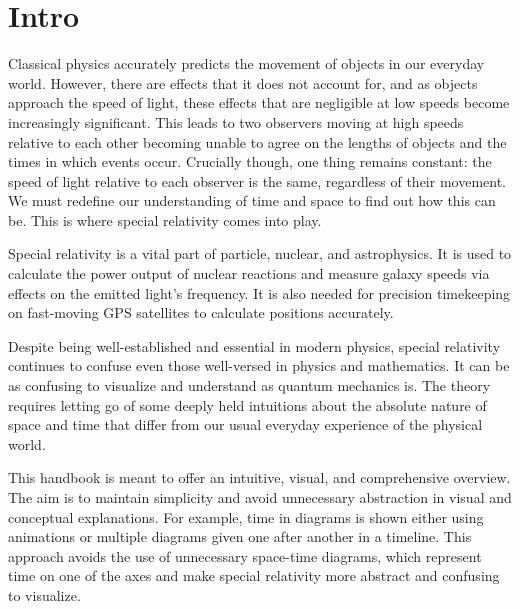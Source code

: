 \frontmatter
\chapter{Intro}

Classical physics accurately predicts the movement of objects in our everyday world. However, there are effects that it does not account for, and as objects approach the speed of light, these effects that are negligible at low speeds become increasingly significant. This leads to two observers moving at high speeds relative to each other becoming unable to agree on the lengths of objects and the times in which events occur. Crucially though, one thing remains constant: the speed of light relative to each observer is the same, regardless of their movement. We must redefine our understanding of time and space to find out how this can be. This is where special relativity comes into play.

Special relativity is a vital part of particle, nuclear, and astrophysics. It is used to calculate the power output of nuclear reactions and measure galaxy speeds via effects on the emitted light's frequency. It is also needed for precision timekeeping on fast-moving GPS satellites to calculate positions accurately.

Despite being well-established and essential in modern physics, special relativity continues to confuse even those well-versed in physics and mathematics. It can be as confusing to visualize and understand as quantum mechanics is. The theory requires letting go of some deeply held intuitions about the absolute nature of space and time that differ from our usual everyday experience of the physical world.

This handbook is meant to offer an intuitive, visual, and comprehensive overview. The aim is to maintain simplicity and avoid unnecessary abstraction in visual and conceptual explanations. For example, time in diagrams is shown either using animations or multiple diagrams given one after another in a timeline. This approach avoids the use of unnecessary space-time diagrams, which represent time on one of the axes and make special relativity more abstract and confusing to visualize.

